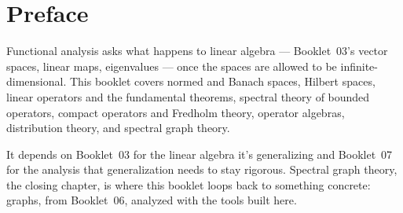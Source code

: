 \chapter*{Preface}

Functional analysis asks what happens to linear algebra ---
Booklet~03's vector spaces, linear maps, eigenvalues --- once the spaces
are allowed to be infinite-dimensional. This booklet covers normed and
Banach spaces, Hilbert spaces, linear operators and the fundamental
theorems, spectral theory of bounded operators, compact operators and
Fredholm theory, operator algebras, distribution theory, and spectral
graph theory.

It depends on Booklet~03 for the linear algebra it's generalizing and
Booklet~07 for the analysis that generalization needs to stay rigorous.
Spectral graph theory, the closing chapter, is where this booklet loops
back to something concrete: graphs, from Booklet~06, analyzed with the
tools built here.

